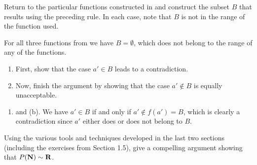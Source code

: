 \documentclass{lew98_solutions}
\begin{document}
\begin{exercise}
\label{ex:1.6.7}
    Return to the particular functions constructed in  and construct the subset \( B \) that results using the preceding rule. In each case, note that \( B \) is not in the range of the function used.
\end{exercise}

\begin{solution}
    For all three functions from  we have \( B = \emptyset \), which does not belong to the range of any of the functions.
\end{solution}

\begin{exercise}
\label{ex:1.6.8}
    \begin{enumerate}
        \item First, show that the case \( a' \in B \) leads to a contradiction.

        \item Now, finish the argument by showing that the case \( a' \not\in B \) is equally unacceptable.
    \end{enumerate}
\end{exercise}

\begin{solution}
    \begin{enumerate}
        \item and (b). We have \( a' \in B \) if and only if \( a' \not\in f(a') = B \), which is clearly a contradiction since \( a' \) either does or does not belong to \( B \).
    \end{enumerate}
\end{solution}

\begin{exercise}
\label{ex:1.6.9}
    Using the various tools and techniques developed in the last two sections (including the exercises from Section 1.5), give a compelling argument showing that \( P(\mathbf{N}) \sim \mathbf{R} \).
\end{exercise}
\end{document}
